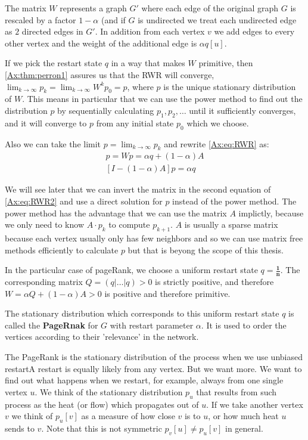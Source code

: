 The matrix $W$ represents a graph $G'$ where each edge of the
original graph $G$ is rescaled by a factor $1 - \alpha$ (and if $G$ is
undirected we treat each undirected edge as $2$ directed edges in
$G'$. In addition from each vertex $v$ we add edges to every other
vertex and the weight of the additional edge is $\alpha q[u]$.

If we pick the restart state $q$ in a way that makes $W$ primitive,
then \ref{Ax:thm:perron1} assures us that the RWR will converge,
$\lim_{k \to \infty} p_k =\lim_{k \to \infty} W^k p_0 = p$, where
$p$ is the unique stationary distribution of $W$. This means in
particular that we can use the power method to find out the
distribution $p$ by sequentially calculating $p_1, p_2, \dots$ until
it sufficiently converges, and it will converge to $p$ from any
initial state $p_0$ which we choose. 

Also we can take the limit $p = \lim_{k \to \infty}p_k$ and rewrite
\ref{Ax:eq:RWR} as:
\begin{equation}
\label{Ax:eq:RWR2}
\begin{aligned}
p = Wp = \alpha q + (1 - \alpha) A \\
[I - (1 - \alpha)A] p = \alpha q
\end{aligned}
\end{equation}

We will see later that we can invert the matrix in the second
equation of \ref{Ax:eq:RWR2} and use a direct solution for $p$ instead of
the power method. The power method has the advantage that we can use
the matrix $A$ implictly, because we only need to know $A \cdot p_k$
to compute $p_{k+1}$. $A$ is usually a sparse matrix because each
vertex usually only has few neighbors and so we can use matrix free
methods efficiently to calculate $p$ but that is beyong the scope of
this thesis.

In the particular case of pageRank, we choose a uniform restart
state $q = \mathbf{\frac{1}{n}}$. The corresponding matrix $Q =
(q|\dots|q) \gt 0$ is strictly positive, and therefore 
$W = \alpha Q + (1 - \alpha)A > 0$ is positive and therefore
primitive.

The stationary distribution which corresponds to this uniform
restart state $q$ is called the \textbf{PageRnak} for $G$ with
restart parameter $\alpha$. It is used to order the vertices
according to their 'relevance' in the network.



The PageRank is the stationary distribution of the process when we use unbiased
restart\textemdash A restart is equally likely from any vertex.
But we want more. We want to find out what happens when we restart, for example,
always from one single vertex $u$. We think of the stationary distribution $p_u$ that 
results from such process as the heat (or flow) which propagates out of $u$.
If we take another vertex $v$ we think of $p_u[v]$ as a measure of how close $v$
is to $u$, or how much heat $u$ sends to $v$.
Note that this is not symmetric $p_v[u] \neq p_u[v]$ in general.

